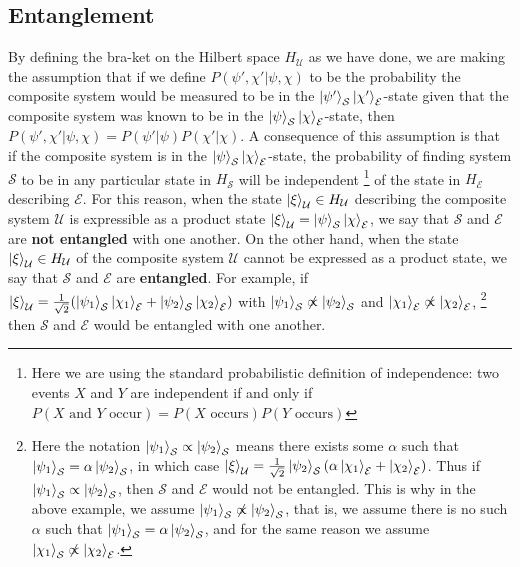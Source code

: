\documentclass[letter, 12pt]{turabian-thesis}
\theoremstyle{hypothesis}
\let\origfootnote\footnote %
\renewcommand{\footnote}[1]{%
\noindent %
\origfootnote{#1}}
\begin{document}
\subsection{Entanglement}  
 By defining the bra-ket on the Hilbert space $H_\mathcal{U}$ as we have done, we are making the assumption that if we define $P(\psi',\chi'|\psi,\chi)$ to be the probability the composite system would be measured to be in the $\ket{\psi'}_\mathcal{S}\ket{\chi'}_\mathcal{E}$-state given that the composite system was known to be in the $\ket{\psi}_\mathcal{S}\ket{\chi}_\mathcal{E}$-state, then $P(\psi',\chi'|\psi,\chi)=P(\psi'|\psi)P(\chi'|\chi).$ A consequence of this assumption is that if the composite system is in the $\ket{\psi}_\mathcal{S}\ket{\chi}_\mathcal{E}$-state, the probability of finding system $\mathcal{S}$ to be in any particular state in $H_\mathcal{S}$ will be independent\footnote{Here we are using the standard probabilistic definition of independence: two events $X$ and $Y$ are independent if and only if $P(X \text{ and } Y\text{ occur})=P(X\text{ occurs})P(Y\text{ occurs})$} of the state in $H_\mathcal{E}$ describing $\mathcal{E}$. For this reason, when the state $\ket{\xi}_\mathcal{U}\in H_\mathcal{U}$ describing the composite system $\mathcal{U}$ is expressible as a product state $\ket{\xi}_\mathcal{U}=\ket{\psi}_\mathcal{S}\ket{\chi}_\mathcal{E}$,  we say that $\mathcal{S}$ and $\mathcal{E}$ are \textbf{not entangled} with one another. On the other hand, when  the state $\ket{\xi}_\mathcal{U}\in H_\mathcal{U}$ of the composite system $\mathcal{U}$ cannot be expressed as a product state, we say that $\mathcal{S}$ and $\mathcal{E}$ are \textbf{entangled}.
   For example, if $\ket{\xi}_\mathcal{U}=\frac{1}{\sqrt{2}}(\ket{\psi_1}_\mathcal{S}\ket{\chi_1}_\mathcal{E}+\ket{\psi_2}_\mathcal{S}\ket{\chi_2}_\mathcal{E})$ with $\ket{\psi_1}_\mathcal{S}\not\propto\ket{\psi_2}_\mathcal{S}$ and $\ket{\chi_1}_\mathcal{E}\not\propto\ket{\chi_2}_\mathcal{E}$,\footnote{Here the notation $\ket{\psi_1}_\mathcal{S}\propto\ket{\psi_2}_\mathcal{S}$ means there exists some $\alpha$ such that $\ket{\psi_1}_\mathcal{S}=\alpha\ket{\psi_2}_\mathcal{S}$, in which case $\ket{\xi}_\mathcal{U}=\frac{1}{\sqrt{2}}\ket{\psi_2}_\mathcal{S}(\alpha\ket{\chi_1}_\mathcal{E}+\ket{\chi_2}_\mathcal{E})$. Thus if  $\ket{\psi_1}_\mathcal{S}\propto\ket{\psi_2}_\mathcal{S}$, then  $\mathcal{S}$ and $\mathcal{E}$ would not be entangled. This is why in the above example, we assume $\ket{\psi_1}_\mathcal{S}\not\propto\ket{\psi_2}_\mathcal{S}$, that is, we assume there is no such $\alpha$ such that $\ket{\psi_1}_\mathcal{S}=\alpha\ket{\psi_2}_\mathcal{S}$, and for the same reason we assume $\ket{\chi_1}_\mathcal{S}\not\propto\ket{\chi_2}_\mathcal{E}$.} then $\mathcal{S}$ and $\mathcal{E}$ would be entangled with one another.
  
\end{document}
